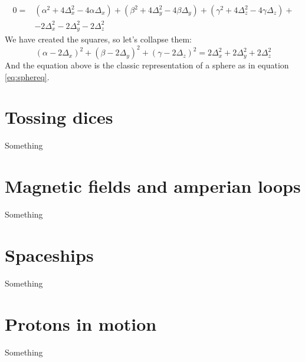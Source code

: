 \begin{equation*}
    \begin{split}
        0 = &(\alpha^2 + 4\Delta^2_x - 4\alpha\Delta_x) +
            (\beta^2 + 4\Delta^2_y - 4\beta\Delta_y) +
            (\gamma^2 + 4\Delta^2_z - 4\gamma\Delta_z) +\\
            &- 2\Delta^2_x - 2\Delta^2_y - 2\Delta^2_z
    \end{split}
\end{equation*}
We have created the squares, so let's collapse them:
\begin{equation*}
    (\alpha - 2\Delta_x)^2 + (\beta - 2\Delta_y)^2 + (\gamma - 2\Delta_z)^2 =
        2\Delta^2_x + 2\Delta^2_y + 2\Delta^2_z
\end{equation*}
And the equation above is the classic representation of a sphere as in
equation \ref{eq:sphereq}.

\section{Tossing dices}
\label{sec:dices}
Something

\section{Magnetic fields and amperian loops}
\label{sec:magnamp}
Something

\section{Spaceships}
\label{sec:spaceship}
Something

\section{Protons in motion}
\label{sec:protons}
Something
